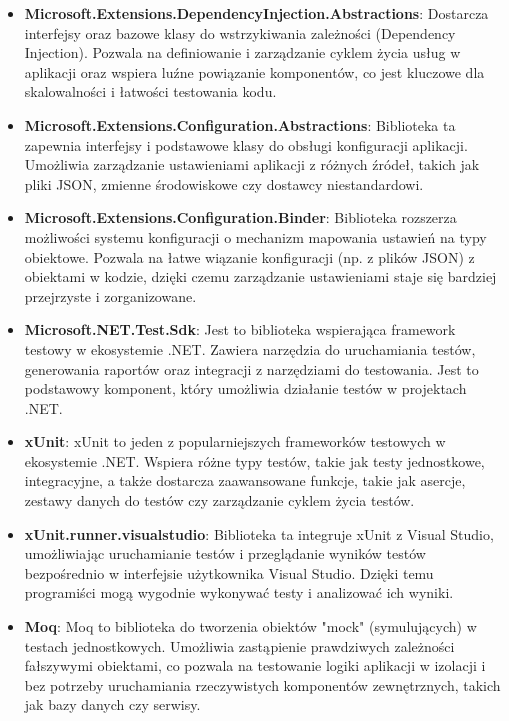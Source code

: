 \documentclass[12pt,a4paper]{article}
\begin{document}
\begin{itemize}
    \item \textbf{Microsoft.Extensions.DependencyInjection.Abstractions}: Dostarcza interfejsy oraz bazowe klasy do wstrzykiwania zależności (Dependency Injection). Pozwala na definiowanie i zarządzanie cyklem życia usług w aplikacji oraz wspiera luźne powiązanie komponentów, co jest kluczowe dla skalowalności i łatwości testowania kodu.
    \item \textbf{Microsoft.Extensions.Configuration.Abstractions}: Biblioteka ta zapewnia interfejsy i podstawowe klasy do obsługi konfiguracji aplikacji. Umożliwia zarządzanie ustawieniami aplikacji z różnych źródeł, takich jak pliki JSON, zmienne środowiskowe czy dostawcy niestandardowi.
    \item \textbf{Microsoft.Extensions.Configuration.Binder}: Biblioteka rozszerza możliwości systemu konfiguracji o mechanizm mapowania ustawień na typy obiektowe. Pozwala na łatwe wiązanie konfiguracji (np. z plików JSON) z obiektami w kodzie, dzięki czemu zarządzanie ustawieniami staje się bardziej przejrzyste i zorganizowane.

    \item \textbf{Microsoft.NET.Test.Sdk}: Jest to biblioteka wspierająca framework testowy w ekosystemie .NET. Zawiera narzędzia do uruchamiania testów, generowania raportów oraz integracji z narzędziami do testowania. Jest to podstawowy komponent, który umożliwia działanie testów w projektach .NET.
    \item \textbf{xUnit}: xUnit to jeden z popularniejszych frameworków testowych w ekosystemie .NET. Wspiera różne typy testów, takie jak testy jednostkowe, integracyjne, a także dostarcza zaawansowane funkcje, takie jak asercje, zestawy danych do testów czy zarządzanie cyklem życia testów.
    \item \textbf{xUnit.runner.visualstudio}: Biblioteka ta integruje xUnit z Visual Studio, umożliwiając uruchamianie testów i przeglądanie wyników testów bezpośrednio w interfejsie użytkownika Visual Studio. Dzięki temu programiści mogą wygodnie wykonywać testy i analizować ich wyniki.
    \item \textbf{Moq}: Moq to biblioteka do tworzenia obiektów "mock" (symulujących) w testach jednostkowych. Umożliwia zastąpienie prawdziwych zależności fałszywymi obiektami, co pozwala na testowanie logiki aplikacji w izolacji i bez potrzeby uruchamiania rzeczywistych komponentów zewnętrznych, takich jak bazy danych czy serwisy.


\end{itemize}
\end{document}
